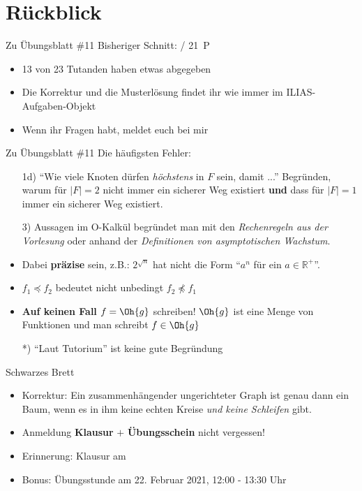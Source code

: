 
\newcommand{\handout}{}



\morescalingdelimiters



\section{Rückblick}

\begin{frame}{Zu Übungsblatt \#11}
	Bisheriger Schnitt:  / 21~P

	\begin{itemize}
		\item 13 von 23 Tutanden haben etwas abgegeben
		\item Die Korrektur und die Musterlösung findet ihr wie immer im ILIAS-Aufgaben-Objekt
		\item Wenn ihr Fragen habt, meldet euch bei mir
	\end{itemize}
\end{frame}

\begin{frame}{Zu Übungsblatt \#11}
	Die häufigsten Fehler:
	\begin{itemize}[<+->]
		\item[1d)] ``Wie viele Knoten dürfen \textit{höchstens} in $F$ sein, damit ...''
		\implitem Begründen, warum für $|F| = 2$ nicht immer ein sicherer Weg existiert \textbf{und} dass für $|F|=1$ immer ein sicherer Weg existiert.
		\item[3)] Aussagen im O-Kalkül begründet man mit den \textit{Rechenregeln aus der Vorlesung} oder anhand der \textit{Definitionen von asymptotischen Wachstum}.
		\item Dabei \textbf{präzise} sein, z.B.: $2^{\sqrt{n}}$ hat nicht die Form ``$a^n$ für ein $a\in \mathbb{R}^+$''.
		\item $f_1 \preceq f_2$ bedeutet nicht unbedingt $f_2 \not\preceq f_1$
		\item \textbf{Auf keinen Fall} $f=\Oh{g}$ schreiben! $\Oh{g}$ ist eine Menge von Funktionen und man schreibt $f\in\Oh{g}$
		\item[*)] ``Laut Tutorium'' ist keine gute Begründung \smiley
	\end{itemize}
\end{frame}

\begin{frame}{Schwarzes Brett}
	\begin{itemize}
		\item Korrektur: Ein zusammenhängender ungerichteter Graph ist genau dann ein Baum, wenn es in ihm keine echten Kreise \textit{und keine Schleifen} gibt.
		\item Anmeldung \textbf{Klausur} $+$ \textbf{Übungsschein} nicht vergessen!
		\item Erinnerung: Klausur am \Klausurtermin
		\item Bonus: Übungsstunde am 22. Februar 2021, 12:00 - 13:30 Uhr
	\end{itemize}
\end{frame}

